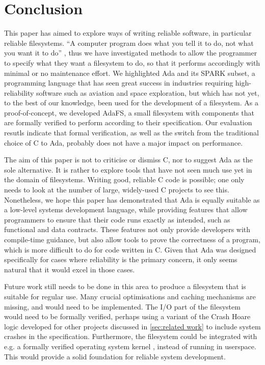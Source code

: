 \section{Conclusion}
This paper has aimed to explore ways of writing reliable software, in particular reliable filesystems.
``A computer program does what you tell it to do, not what you want it to do'' \cite{bloch1997}, thus we have investigated methods to allow the programmer to specify what they want a filesystem to do, so that it performs accordingly with minimal or no maintenance effort.
We highlighted Ada and its SPARK subset, a programming language that has seen great success in industries requiring high-reliability software such as aviation and space exploration, but which has not yet, to the best of our knowledge, been used for the development of a filesystem.
As a proof-of-concept, we developed AdaFS, a small filesystem with components that are formally verified to perform according to their specification.
Our evaluation resutls indicate that formal verification, as well as the switch from the traditional choice of C to Ada, probably does not have a major impact on performance.

The aim of this paper is not to criticise or dismiss C, nor to suggest Ada as the sole alternative.
It is rather to explore tools that have not seen much use yet in the domain of filesystems.
Writing good, reliable C code is possible; one only needs to look at the number of large, widely-used C projects to see this.
Nonetheless, we hope this paper has demonstrated that Ada is equally suitable as a low-level systems development language, while providing features that allow programmers to ensure that their code runs exactly as intended, such as functional and data contracts.
These features not only provide developers with compile-time guidance, but also allow tools to prove the correctness of a program, which is more difficult to do for code written in C.
Given that Ada was designed specifically for cases where reliability is the primary concern, it only seems natural that it would excel in those cases.

Future work still needs to be done in this area to produce a filesystem that is suitable for regular use.
Many crucial optimisations and caching mechanisms are missing, and would need to be implemented.
The I/O part of the filesystem would need to be formally verified, perhaps using a variant of the Crash Hoare logic developed for other projects discussed in \autoref{sec:related work} to include system crashes in the specification.
Furthermore, the filesystem could be integrated with e.g. a formally verified operating system kernel \cite{king2019}, instead of running in userspace.
This would provide a solid foundation for reliable system development.
